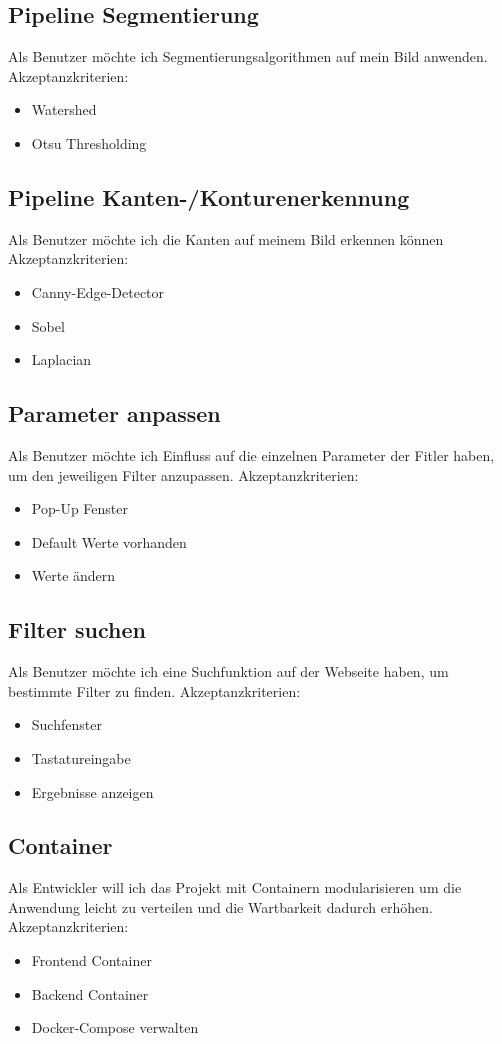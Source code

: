 \documentclass[conference]{IEEEtran}
\begin{document}
\subsection{Pipeline Segmentierung}
Als Benutzer möchte ich Segmentierungsalgorithmen auf mein Bild anwenden.
Akzeptanzkriterien:
\begin{itemize}
	\item Watershed
	\item Otsu Thresholding
\end{itemize}

\subsection{Pipeline Kanten-/Konturenerkennung}
Als Benutzer möchte ich die Kanten auf meinem Bild erkennen können
Akzeptanzkriterien:
\begin{itemize}
	\item Canny-Edge-Detector
	\item Sobel
	\item Laplacian
\end{itemize}

\subsection{Parameter anpassen}
Als Benutzer möchte ich Einfluss auf die einzelnen Parameter der Fitler haben, um den jeweiligen Filter anzupassen.
Akzeptanzkriterien: 
\begin{itemize}
	\item Pop-Up Fenster
	\item Default Werte vorhanden
	\item Werte ändern
\end{itemize}

\subsection{Filter suchen}
Als Benutzer möchte ich eine Suchfunktion auf der Webseite haben, um bestimmte Filter zu finden. 
Akzeptanzkriterien: 
\begin{itemize}
	\item Suchfenster
	\item Tastatureingabe
	\item Ergebnisse anzeigen
\end{itemize}

\subsection{Container}
Als Entwickler will ich das Projekt mit Containern modularisieren um die Anwendung leicht zu verteilen und die Wartbarkeit dadurch erhöhen.
Akzeptanzkriterien: 
\begin{itemize}
	\item Frontend Container
	\item Backend Container
	\item Docker-Compose verwalten
\end{itemize}
\end{document}
